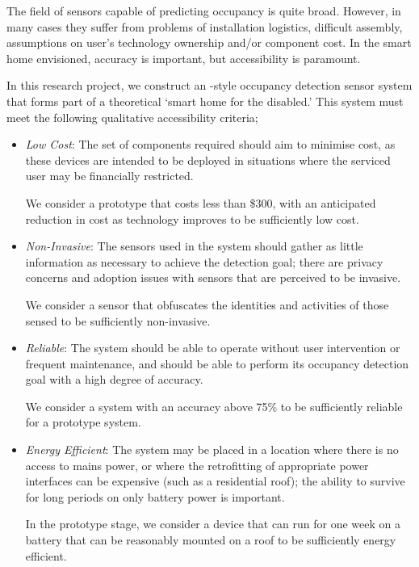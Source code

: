 \documentclass[../thesis/thesis.tex]{subfiles}
\begin{document}
The field of sensors capable of predicting occupancy is quite broad. However, in many cases they suffer from problems of installation logistics, difficult assembly, assumptions on user's technology ownership and/or component cost. In the smart home envisioned, accuracy is important, but accessibility is paramount.

In this research project, we construct an \iot-style occupancy detection sensor system that forms part of a theoretical `smart home for the disabled.' This system must meet the following qualitative accessibility criteria;

\begin{itemize}
 \item \emph{Low Cost}: The set of components required should aim to minimise cost, as these devices are intended to be deployed in situations where the serviced user may be financially restricted. 

 We consider a prototype that costs less than \$300, with an anticipated reduction in cost as technology improves to be sufficiently low cost.
  
 \item \emph{Non-Invasive}: The sensors used in the system should gather as little information as necessary to achieve the detection goal; there are privacy concerns and adoption issues with sensors that are perceived to be invasive.

 We consider a sensor that obfuscates the identities and activities of those sensed to be sufficiently non-invasive.
 
 \item \emph{Reliable}: The system should be able to operate without user intervention or frequent maintenance, and should be able to perform its occupancy detection goal with a high degree of accuracy.

 We consider a system with an accuracy above 75\% to be sufficiently reliable for a prototype system.
 
 \item \emph{Energy Efficient}: The system may be placed in a location where there is no access to mains power, or where the retrofitting of appropriate power interfaces can be expensive (such as a residential roof); the ability to survive for long periods on only battery power is important.

 In the prototype stage, we consider a device that can run for one week on a battery that can be reasonably mounted on a roof to be sufficiently energy efficient.
\end{itemize}
\end{document}
